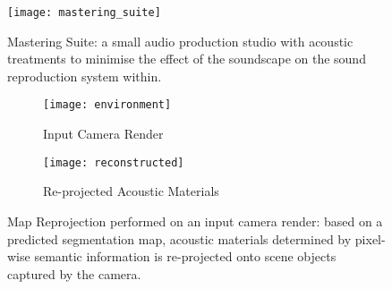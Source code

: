 \begin{figure}[htbp]
    \centering
    \texttt{[image: mastering\_suite]}
    \caption{Mastering Suite: a small audio production studio with acoustic treatments to minimise the effect of the soundscape on the sound reproduction system within.}
    \label{fig:conservatoire-iso-render}
\end{figure}


\begin{figure}
    \centering
    \begin{subfigure}[t]{0.49\textwidth}
       \centering
       \texttt{[image: environment]}
       \caption{Input Camera Render}
       \label{fig:chi-input-env}
    \end{subfigure}
    \begin{subfigure}[t]{0.49\textwidth}
       \centering
       \texttt{[image: reconstructed]}
       \caption{Re-projected Acoustic Materials}
       \label{fig:chi-reconstructed-env}
    \end{subfigure}
\caption{Map Reprojection performed on an input camera render: based on a predicted segmentation map, acoustic materials determined by pixel-wise semantic information is re-projected onto scene objects captured by the camera.}
\label{fig:chi-scanning}
\end{figure}

